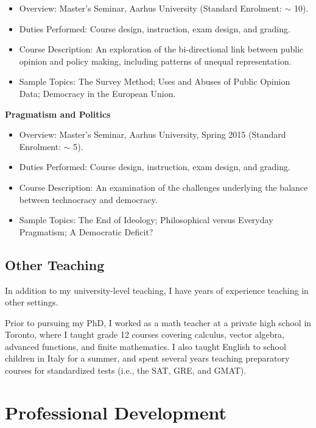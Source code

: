 \documentclass[11pt]{article}
\begin{document}
	      \begin{itemize}[itemsep=0em, topsep=0em, partopsep=0em]
	      	\kern-\parskip\item Overview: Master’s Seminar, Aarhus University (Standard Enrolment: $\sim$ 10).
	      	\item Duties Performed: Course design, instruction, exam design, and grading.
	      	\item Course Description: An exploration of the bi-directional link between public opinion and policy making, including patterns of unequal representation.
	      	\item Sample Topics: The Survey Method; Uses and Abuses of Public Opinion Data; Democracy in the European Union.
	      \end{itemize}
	\textbf{Pragmatism and Politics}
	      \begin{itemize}[itemsep=0em, topsep=0em, partopsep=0em]
	      	\kern-\parskip\item Overview: Master’s Seminar, Aarhus University, Spring 2015 (Standard Enrolment: $\sim$ 5).
	      	\item Duties Performed: Course design, instruction, exam design, and grading.
	      	\item Course Description: An examination of the challenges underlying the balance between technocracy and democracy.
	      	\item Sample Topics: The End of Ideology; Philosophical versus Everyday Pragmatism; A Democratic Deficit?
	      \end{itemize}

\subsection{Other Teaching}
In addition to my university-level teaching, I have years of experience teaching in other settings. 

Prior to pursuing my PhD, I worked as a math teacher at a private high school in Toronto, where I taught grade 12 courses covering calculus, vector algebra, advanced functions, and finite mathematics. I also taught English to school children in Italy for a summer, and spent several years teaching preparatory courses for standardized tests (i.e., the SAT, GRE, and GMAT).

\section{ Professional Development}
\end{document}
